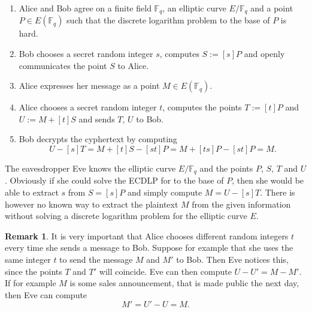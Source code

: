 \documentclass{article}
\numberwithin{equation}{section}
\theoremstyle{definition}
\newtheorem{remark}[theorem]{Remark}
\newcommand{\FF}[1]{{\mathbb F}_{#1}} %
\begin{document}
\begin{enumerate}
\item Alice and Bob agree on a finite field $\FF{q}$, an elliptic curve $E/\FF{q}$ and a point $P \in E(\FF{q})$ such that the discrete logarithm problem to the base of $P$ is hard.
\item Bob chooses a secret random integer $s$, computes $S:=[s]P$ and openly communicates the point $S$ to Alice.
\item Alice expresses her message as a point $M \in E(\FF{q})$.
\item Alice chooses a secret random integer $t$, computes the points $T:=[t]P$ and $U:=M+[t]S$ and sends $T$, $U$ to Bob.
\item Bob decrypts the cyphertext by computing $$U-[s]T=M+[t]S-[st]P = M + [ts]P-[st]P=M.$$
\end{enumerate}

The eavesdropper Eve knows the elliptic curve $E/\FF{q}$ and the points $P$, $S$, $T$ and $U$. Obviously if she could solve the ECDLP for to the base of $P$, then she would be able to extract $s$ from $S=[s]P$ and simply compute $M=U-[s]T$. There is however no known way to extract the plaintext $M$ from the given information without solving a discrete logarithm problem for the elliptic curve $E$. 

\begin{remark}
It is very important that Alice chooses different random integers $t$ every time she sends a message to Bob. Suppose for example that she uses the same integer $t$ to send the message $M$ and $M'$ to Bob. Then Eve notices this, since the points $T$ and $T'$ will coincide. Eve can then compute $U-U'=M-M'.$ If for example $M$ is some sales announcement, that is made public the next day, then Eve can compute $$M'=U'-U=M.$$ 
\end{remark}
\end{document}
